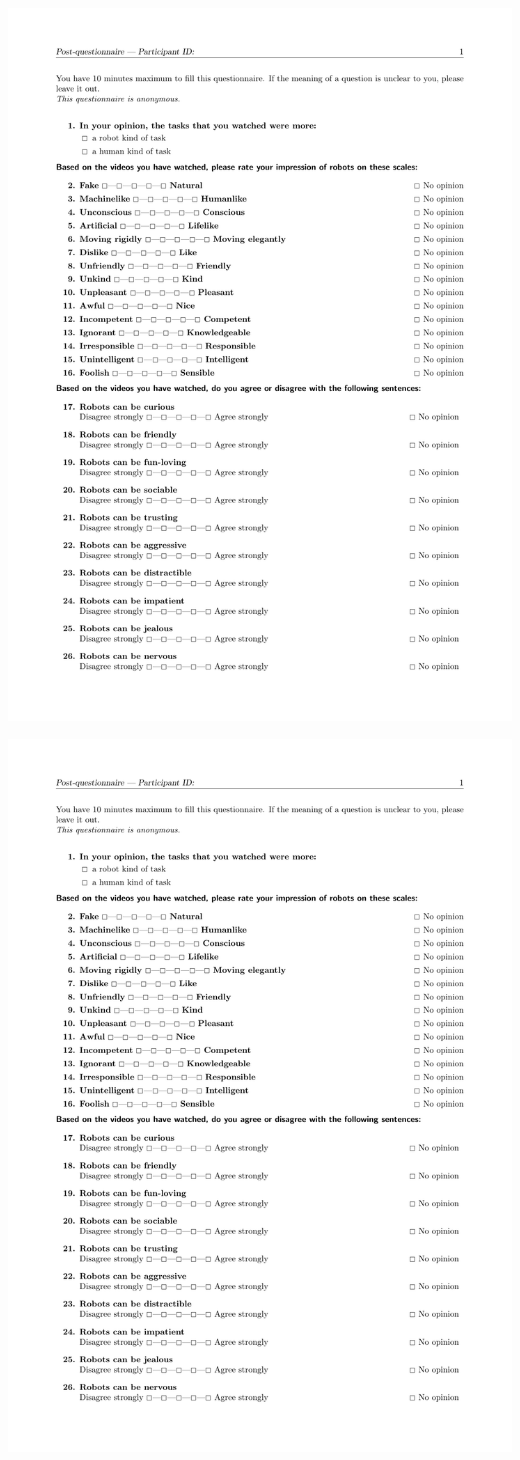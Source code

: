 \documentclass[lettersize, noapacite, twoside, HRI]{apa_HRI}
\begin{document}
\begin{center}
    \includegraphics[width=0.9\linewidth]{post-questionnaire}

    \includegraphics[width=0.9\linewidth, page=2]{post-questionnaire}
\end{center}
%
%
\end{document}
